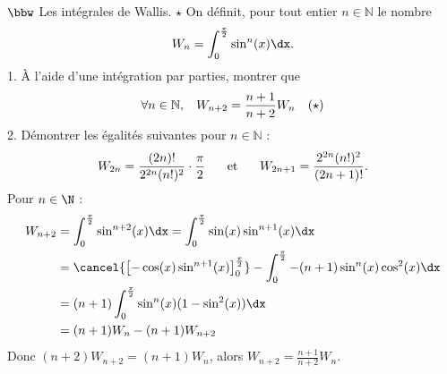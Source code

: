 \documentclass[11pt]{article}
\begin{document}
\begin{exercice}{$\bbw$ Les intégrales de Wallis. $\star$}{}
    On définit, pour tout entier $n\in\mathbb{N}$ le nombre
    \begin{equation*}
        W_n = \int_0^{\frac{\pi}{2}}{\sin^n(x)\dx}.
    \end{equation*}
    1. À l'aide d'une intégration par parties, montrer que
    \begin{equation*}
        \forall{n\in\mathbb{N}}, \hspace{0.3cm} W_{n+2} = \frac{n+1}{n+2}W_n \quad (\star)
    \end{equation*}
    2. Démontrer les égalités suivantes pour $n\in\mathbb{N}$ :
    \begin{equation*}
        W_{2n}=\frac{(2n)!}{2^{2n}(n!)^2}\cdot\frac{\pi}{2} \hspace{0.5cm} \text{ et } \hspace{0.5cm} W_{2n+1}=\frac{2^{2n}(n!)^2}{(2n+1)!}.
    \end{equation*}
    \tcblower
     Pour $n\in\N$ :
    \begin{align*}
        W_{n+2}&=\int_0^{\frac{\pi}{2}}\sin^{n+2}(x)\dx = \int_0^\frac{\pi}{2}\sin(x)\sin^{n+1}(x)\dx\\
        &=\cancel{\left[ -\cos(x)\sin^{n+1}(x) \right]_0^{\frac{\pi}{2}}}-\int_0^\frac{\pi}{2}-(n+1)\sin^n(x)\cos^2(x)\dx\\
        &=(n+1)\int_0^\frac{\pi}{2}\sin^n(x)(1-\sin^2(x))\dx\\
        &=(n+1)W_n - (n+1)W_{n+2}
    \end{align*}
    Donc $(n+2)W_{n+2}=(n+1)W_n$, alors $W_{n+2}=\frac{n+1}{n+2}W_n$.
\end{exercice}
\end{document}
